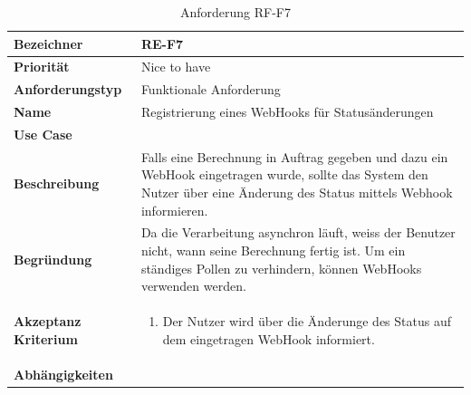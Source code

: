\begin{table}[ht]
\centering
  \begin{tabular}{ l | p{8cm} }
	\hline
	\rowcolor{gray}
	\textbf{Bezeichner}&	\textbf{RE-F7}\\ \hline
	\textbf{Priorität} 		&	Nice to have\\ \hline
	\textbf{Anforderungstyp}	&	Funktionale Anforderung\\ \hline
	\textbf{Name} 			&	Registrierung eines WebHooks für Statusänderungen\\ \hline
	\textbf{Use Case} 		&	\nameref{table:use_case_4}\\ \hline
	\textbf{Beschreibung} 	&	Falls eine Berechnung in Auftrag gegeben und dazu ein WebHook eingetragen wurde, sollte das System den Nutzer über eine Änderung des Status mittels 
						Webhook informieren.\\ \hline
	\textbf{Begründung} 		&	Da die Verarbeitung asynchron läuft, weiss der Benutzer nicht, wann seine Berechnung fertig ist. Um ein ständiges Pollen zu verhindern, können 
							WebHooks verwenden werden.\\ \hline
	\textbf{Akzeptanz Kriterium}	&	\begin{enumerate}
					\item Der Nutzer wird über die Änderunge des Status auf dem eingetragen WebHook informiert.
					\end{enumerate}
					\\ \hline
	\textbf{Abhängigkeiten} 	&	\nameref{table:req_2}\\ \hline
  \end{tabular}
   \caption{Anforderung RF-F7}\label{table:req_7}
\end{table}


